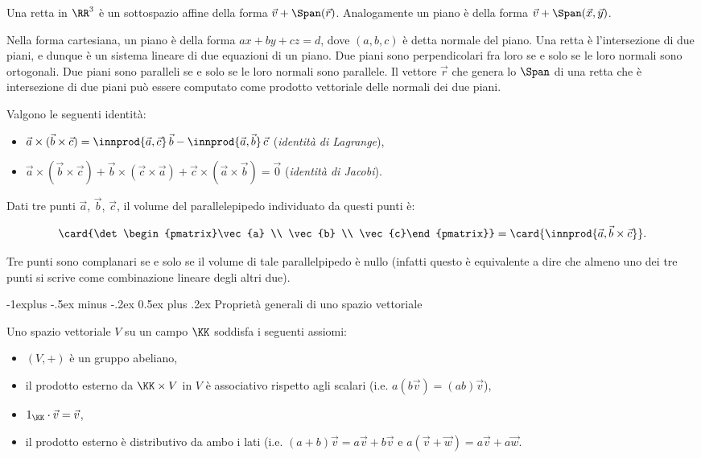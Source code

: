 \documentclass[10pt,landscape]{article}
\makeatletter
\renewcommand{\subsection}{\@startsection{subsection}{2}{0mm}%
	{-1explus -.5ex minus -.2ex}%
	{0.5ex plus .2ex}%
	{\normalfont\normalsize\bfseries}}
\makeatother
\begin{document}
\begin{multicols}{3}
		Una retta in $\RR^3$ è un sottospazio affine della
		forma $\vec{v} + \Span(\vec{r})$. Analogamente
		un piano è della forma $\vec{v} + \Span(\vec{x}, \vec{y})$.
		
		Nella forma cartesiana, un piano è della forma $ax+by+cz=d$,
		dove $(a,b,c)$ è detta normale del piano. Una retta è
		l'intersezione di due piani, e dunque è un sistema lineare
		di due equazioni di un piano. Due piani sono perpendicolari
		fra loro se e solo se le loro normali sono ortogonali. Due
		piani sono paralleli se e solo se le loro normali sono parallele.
		Il vettore $\vec{r}$ che genera lo $\Span$ di una retta che è
		intersezione di due piani può essere computato come
		prodotto vettoriale delle normali dei due piani.
		
		Valgono le seguenti identità:
		
		\begin{itemize}
			\item $\vec{a} \times (\vec{b} \times \vec{c}) =
			\innprod{\vec{a}, \vec{c}}\,\vec{b} - \innprod{\vec{a}, \vec{b}}\,\vec{c}$ (\textit{identità di Lagrange}),
			\item $\vec{a} \times (\vec{b} \times \vec{c}) + \vec{b} \times (\vec{c} \times \vec{a}) + \vec{c} \times (\vec{a} \times \vec{b}) =
			\vec{0}$ (\textit{identità di Jacobi}).
		\end{itemize}
		
		Dati tre punti $\vec{a}$, $\vec{b}$, $\vec{c}$, il volume
		del parallelepipedo individuato da questi punti è:
		
		\[\card{\det\begin{pmatrix}\vec{a} \\ \vec{b} \\ \vec{c}\end{pmatrix}} =
		\card{\innprod{\vec{a}, \vec{b} \times \vec{c}}}.\]
		
		Tre punti sono complanari se e solo se il volume di tale parallelpipedo è nullo
		(infatti questo è equivalente a dire che almeno uno dei tre punti
		si scrive come combinazione lineare degli altri due).
		
		
		\subsection{Proprietà generali di uno spazio vettoriale}
		
		Uno spazio vettoriale $V$ su un campo $\KK$ soddisfa i seguenti
		assiomi:
		
		\begin{itemize}
			\item $(V, +)$ è un gruppo abeliano,
			\item il prodotto esterno da $\KK \times V$ in $V$ è
			associativo rispetto agli scalari (i.e. $a(b\vec{v}) = (ab)\vec{v}$),
			\item $1_{\KK} \cdot \vec{v} = \vec{v}$,
			\item il prodotto esterno è distributivo da ambo i
			lati (i.e. $(a+b)\vec{v} = a\vec{v} + b\vec{v}$ e
			$a(\vec{v} + \vec{w}) = a\vec{v} + a\vec{w}$.
		\end{itemize}
		

\end{multicols}
\end{document}
